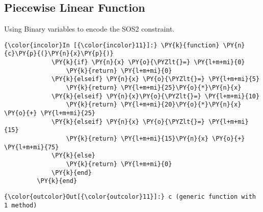 \subsection{Piecewise Linear Function}
Using Binary variables to encode the SOS2 constraint.
\begin{codeCell}
\label{code:pwl}

    \begin{Verbatim}[commandchars=\\\{\}]
{\color{incolor}In [{\color{incolor}11}]:} \PY{k}{function} \PY{n}{c}\PY{p}{(}\PY{n}{x}\PY{p}{)}
             \PY{k}{if} \PY{n}{x} \PY{o}{\PYZlt{}=} \PY{l+m+mi}{0}
                 \PY{k}{return} \PY{l+m+mi}{0}
             \PY{k}{elseif} \PY{n}{x} \PY{o}{\PYZlt{}=} \PY{l+m+mi}{5}
                 \PY{k}{return} \PY{l+m+mi}{25}\PY{o}{*}\PY{n}{x}
             \PY{k}{elseif} \PY{n}{x}\PY{o}{\PYZlt{}=} \PY{l+m+mi}{10}
                 \PY{k}{return} \PY{l+m+mi}{20}\PY{o}{*}\PY{n}{x} \PY{o}{+} \PY{l+m+mi}{25}
             \PY{k}{elseif} \PY{n}{x} \PY{o}{\PYZlt{}=} \PY{l+m+mi}{15}
                 \PY{k}{return} \PY{l+m+mi}{15}\PY{n}{x} \PY{o}{+} \PY{l+m+mi}{75}
             \PY{k}{else}
                 \PY{k}{return} \PY{l+m+mi}{0}
             \PY{k}{end}
         \PY{k}{end}
\end{Verbatim}


\begin{Verbatim}[commandchars=\\\{\}]
{\color{outcolor}Out[{\color{outcolor}11}]:} c (generic function with 1 method)
\end{Verbatim}
            

\end{codeCell}
